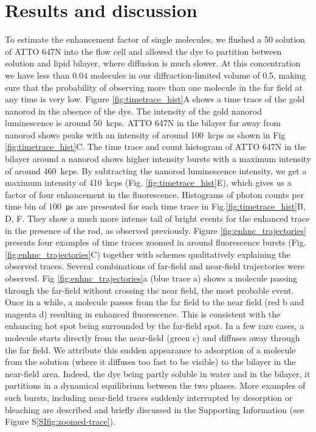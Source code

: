 \section{Results and discussion}
To estimate the enhancement factor of single molecules, we flushed a \SI{50}{\pM} solution of ATTO 647N into the flow cell and allowed the dye to partition between solution and lipid bilayer, where diffusion is much slower.
At this concentration we have less than $0.04$ molecules in our diffraction-limited volume of \SI{0.5}{\fL}, making sure that the probability of observing more than one molecule in the far field at any time is very low.
Figure \ref{fig:timetrace_hist}A shows a time trace of the gold nanorod in the absence of the dye.
The intensity of the gold nanorod luminescence is around \SI{50}{kcps}.
ATTO 647N in the bilayer far away from nanorod shows peaks with an intensity of around \SI{100}{kcps} as shown in Fig \ref{fig:timetrace_hist}C.
The time trace and count histogram of ATTO 647N in the bilayer around a nanorod shows higher intensity bursts with a maximum intensity of around \SI{460}{kcps}. 
By subtracting the nanorod luminescence intensity, we get a maximum intensity of \SI{410}{kcps} (Fig. \ref{fig:timetrace_hist}E), which gives us a factor of four enhancement in the fluorescence. Histograms of photon counts per time bin of \SI{100}{\us} are presented for each time trace in Fig.\ref{fig:timetrace_hist}B, D, F. 
They show a much more intense tail of bright events for the enhanced trace in the presence of the rod, as observed previously.\cite{khatua2014resonant}
Figure \ref{fig:enhnc_trajectories} presents four examples of time traces zoomed in around fluorescence bursts (Fig. \ref{fig:enhnc_trajectories}C) together with schemes qualitatively explaining the observed traces.
Several combinations of far-field and near-field trajectories were observed.
Fig \ref{fig:enhnc_trajectories}a (blue trace a) shows a molecule passing through the far-field without crossing the near field, the most probable event.
Once in a while, a molecule passes from the far field to the near field (red b and magenta d) resulting in enhanced fluorescence.
This is consistent with the enhancing hot spot being surrounded by the far-field spot.
In a few rare cases, a molecule starts directly from the near-field (green c) and diffuses away through the far field.
We attribute this sudden appearance to adsorption of a molecule from the solution (where it diffuses too fast to be visible) to the bilayer in the near-field area.
Indeed, the dye being partly soluble in water and in the bilayer, it partitions in a dynamical equilibrium between the two phases.
More examples of such bursts, including near-field traces suddenly interrupted by desorption or bleaching are described and briefly discussed in the Supporting Information (see Figure S\ref{SIfig:zoomed-trace}).

